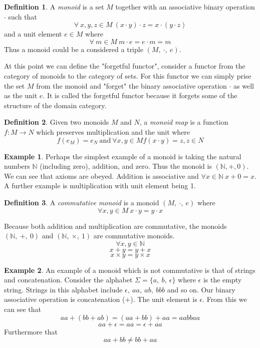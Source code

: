 \documentclass{article}
\theoremstyle{definition}
\newtheorem{definition}{Definition}[section]
\newtheorem{example}{Example}[section]
\begin{document}
\begin{definition}
	A \textit{monoid} is a set $M$ together with an associative binary operation $\cdot$ such that
	$$\forall\ x, y, z \in M\ (x \cdot y) \cdot z = x \cdot (y \cdot z)$$
	and a unit element $e \in M$ where
	$$\forall\ m \in M\ m \cdot e = e \cdot m = m$$
	Thus a monoid could be a considered a triple $(M,\ \cdot,\ e)$.
\end{definition}

At this point we can define the "forgetful functor", consider a functor from the
category of monoids to the category of sets. For this functor we can simply prise the
set $M$ from the monoid and "forget" the binary associative operation $\cdot$ as well as
the unit $e$. It is called the forgetful functor because it forgets some of the structure of
the domain category.

\begin{definition}
	Given two monoids $M$ and $N$, a \textit{monoid map} is a function $f : M \rightarrow N$
	which preserves multiplication and the unit where
	$$f(e_M) = e_N\ \textrm{and}\ \forall x, y \in M f(x \cdot y) = z, z \in N$$
\end{definition}

\begin{example}
	Perhaps the simplest example of a monoid is taking the natural numbers $\mathbb{N}$
	(including zero), addition, and zero.
	Thus the monoid is $(\mathbb{N}, +, 0)$. We can see that axioms
	are obeyed. Addition is associative and $\forall x \in \mathbb{N}\ x + 0 = x$.
	A further example is multiplication with unit element being 1.
\end{example}

\begin{definition}
	A \textit{commutative monoid} is a monoid $(M,\ \cdot,\ e)$ where
	$$\forall x, y \in M\ x \cdot y = y \cdot x$$
\end{definition}

Because both addition and multiplication are commutative, the monoids $(\mathbb{N},\ +,\ 0)$
and $(\mathbb{N},\ \times,\ 1)$ are commutative monoids.
$$ \forall x, y \in \mathbb{N}$$
$$x + y = y + x$$
$$x \times y = y \times x$$

\begin{example}
	An example of a monoid which is not commutative is that of strings and concatenation.
	Consider the alphabet $\Sigma = \{a,\ b,\ \epsilon\}$ where $\epsilon$ is the empty string.
	Strings in this alphabet include $\epsilon,\ aa,\ ab,\ bbb$ and so on.
	Our binary associative operation is concatenation ($+$).
	The unit element is $\epsilon$.
	From this we can see that
	$$aa + (bb + ab) = (aa + bb) + aa = aabbaa$$
	$$aa + \epsilon = aa = \epsilon + aa$$
	Furthermore that
	$$aa + bb \ne bb + aa$$
\end{example}
\end{document}
